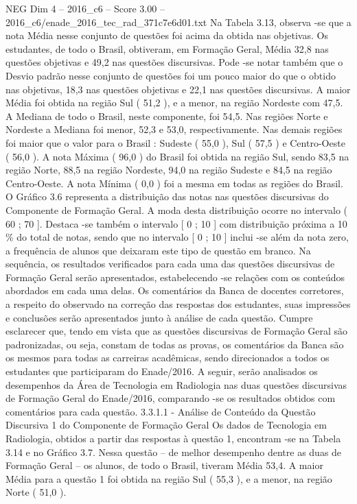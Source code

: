 \begin{textsample}{NEG Dim 4 – 2016\_c6 – Score 3.00 – 2016\_c6/enade\_2016\_tec\_rad\_371c7e6d01.txt}
Na Tabela 3.13, observa -se que a nota Média nesse conjunto de questões foi acima da obtida nas objetivas.
Os estudantes, de todo o Brasil, obtiveram, em Formação Geral, Média 32,8 nas questões objetivas e 49,2 nas questões discursivas.
Pode -se notar também que o Desvio padrão nesse conjunto de questões foi um pouco maior do que o obtido nas objetivas, 18,3 nas questões objetivas e 22,1 nas questões discursivas.
A maior Média foi obtida na região Sul ( 51,2 ), e a menor, na região Nordeste com 47,5.
A Mediana de todo o Brasil, neste componente, foi 54,5.
Nas regiões Norte e Nordeste a Mediana foi menor, 52,3 e 53,0, respectivamente.
Nas demais regiões foi maior que o valor para o Brasil : Sudeste ( 55,0 ), Sul ( 57,5 ) e Centro-Oeste ( 56,0 ).
A nota Máxima ( 96,0 ) do Brasil foi obtida na região Sul, sendo 83,5 na região Norte, 88,5 na região Nordeste, 94,0 na região Sudeste e 84,5 na região Centro-Oeste.
A nota Mínima ( 0,0 ) foi a mesma em todas as regiões do Brasil.
O Gráfico 3.6 representa a distribuição das notas nas questões discursivas do Componente de Formação Geral.
A moda desta distribuição ocorre no intervalo ( 60 ; 70 ].
Destaca -se também o intervalo [ 0 ; 10 ] com distribuição próxima a 10 \% do total de notas, sendo que no intervalo [ 0 ; 10 ] inclui -se além da nota zero, a frequência de alunos que deixaram este tipo de questão em branco.
Na sequência, os resultados verificados para cada uma das questões discursivas de Formação Geral serão apresentados, estabelecendo -se relações com os conteúdos abordados em cada uma delas.
Os comentários da Banca de docentes corretores, a respeito do observado na correção das respostas dos estudantes, suas impressões e conclusões serão apresentados junto à análise de cada questão.
Cumpre esclarecer que, tendo em vista que as questões discursivas de Formação Geral são padronizadas, ou seja, constam de todas as provas, os comentários da Banca são os mesmos para todas as carreiras acadêmicas, sendo direcionados a todos os estudantes que participaram do Enade/2016.
A seguir, serão analisados os desempenhos da Área de Tecnologia em Radiologia nas duas questões discursivas de Formação Geral do Enade/2016, comparando -se os resultados obtidos com comentários para cada questão. 3.3.1.1 - Análise de Conteúdo da Questão Discursiva 1 do Componente de Formação Geral Os dados de Tecnologia em Radiologia, obtidos a partir das respostas à questão 1, encontram -se na Tabela 3.14 e no Gráfico 3.7.
Nessa questão – de melhor desempenho dentre as duas de Formação Geral – os alunos, de todo o Brasil, tiveram Média 53,4.
A maior Média para a questão 1 foi obtida na região Sul ( 55,3 ), e a menor, na região Norte ( 51,0 ).

\end{textsample}
